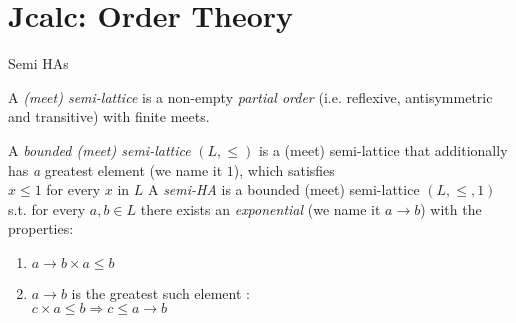 \documentclass{beamer}
\begin{document}
\section{Jcalc: Order Theory}
\begin{frame}{Semi HAs}
  \begin{outline}
  \1 A \textit{(meet) semi-lattice} is a non-empty \emph{partial order} 
  (i.e. reflexive, antisymmetric and transitive) 
  with finite meets.
  
 \1
  A \textit{bounded (meet) semi-lattice} $(L,\le)$ is a (meet) 
  semi-lattice that additionally has 
  \2 \emph a {greatest element} (we name it $1$), which satisfies\\
  $x \le 1$ for every $x$ in $L$  
 \1 A \textit{semi-HA} is a bounded (meet) semi-lattice $(L,\le, 1)$ 
 s.t. for every $a,b\in L$ there exists an \textit{exponential} 
 (we name it $a\rightarrow b$) 
 with the properties: 
 \begin{enumerate}
 \item $a\rightarrow b\times a\le b $
 \item $a\rightarrow b$ is the greatest such element : \\ $c\times a\le b \Longrightarrow c\le a\rightarrow b $
 \end{enumerate}
  \end{outline}
\end{frame}
\end{document}
